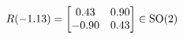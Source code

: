 \documentclass[preview]{standalone}
\begin{document}
\begin{align*}
\special{dvisvgm:raw <g id='unique000'>}R(-1.13) = \begin{bmatrix} 0.43 & 0.90 \\ -0.90 & 0.43 \end{bmatrix} \in \text{SO}(2)\special{dvisvgm:raw </g>}
\end{align*}
\end{document}
